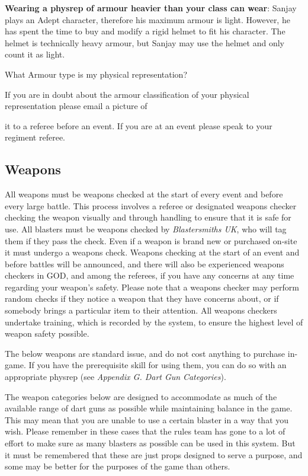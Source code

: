 \textbf{Wearing a physrep of armour heavier than your class can wear}: Sanjay plays an Adept character, therefore his maximum armour is light. However, he has spent the time to buy and modify a rigid helmet to fit his character. The helmet is technically heavy armour, but Sanjay may use the helmet and only count it as light.

What Armour type is my physical representation?

If you are in doubt about the armour classification of your physical representation please email a picture of

it to a referee before an event. If you are at an event please speak to your regiment referee.

\subsection{Weapons}

All weapons must be weapons checked at the start of every event and before every large battle. This process involves a referee or designated weapons checker checking the weapon visually and through handling to ensure that it is safe for use. All blasters must be weapons checked by \textit{Blastersmiths UK}, who will tag them if they pass the check. Even if a weapon is brand new or purchased on-site it must undergo a weapons check. Weapons checking at the start of an event and before battles will be announced, and there will also be experienced weapons checkers in GOD, and among the referees, if you have any concerns at any time regarding your weapon's safety. Please note that a weapons checker may perform random checks if they notice a weapon that they have concerns about, or if somebody brings a particular item to their attention. All weapons checkers undertake training, which is recorded by the system, to ensure the highest level of weapon safety possible.

The below weapons are standard issue, and do not cost anything to purchase in-game. If you have the prerequisite skill for using them, you can do so with an appropriate physrep (see \textit{Appendix G. Dart Gun} \textit{Categories}).

The weapon categories below are designed to accommodate as much of the available range of dart guns as possible while maintaining balance in the game. This may mean that you are unable to use a certain blaster in a way that you wish. Please remember in these cases that the rules team has gone to a lot of effort to make sure as many blasters as possible can be used in this system. But it must be remembered that these are just props designed to serve a purpose, and some may be better for the purposes of the game than others.

